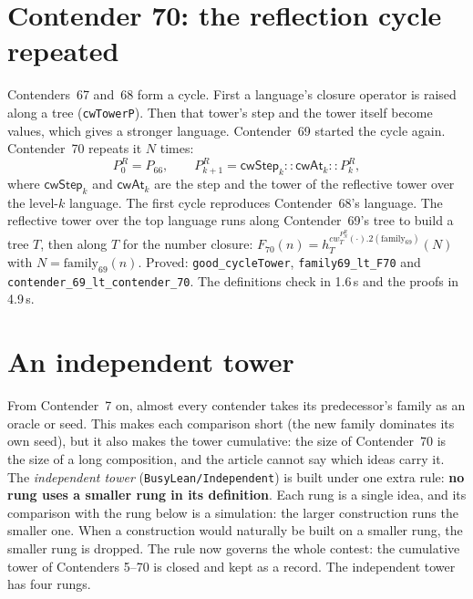 \documentclass[11pt]{article}
\theoremstyle{definition}
\theoremstyle{remark}
\newcommand{\lean}[1]{\texttt{#1}}
\begin{document}
\section{Contender 70: the reflection cycle repeated}

Contenders~67 and~68 form a cycle. First a language's closure operator is
raised along a tree (\lean{cwTowerP}). Then that tower's step and the tower
itself become values, which gives a stronger language. Contender~69 started the
cycle again. Contender~70 repeats it $N$ times:
\[
P^R_0=P_{66},\qquad
P^R_{k+1}=\mathsf{cwStep}_{k}::\mathsf{cwAt}_{k}::P^R_k,
\]
where $\mathsf{cwStep}_k$ and $\mathsf{cwAt}_k$ are the step and the tower of the
reflective tower over the level-$k$ language. The first cycle reproduces
Contender~68's language. The reflective tower over the top language runs along
Contender~69's tree to build a tree $T$, then along $T$ for the number closure:
$F_{70}(n)=h^{cw^{P^R_N}_T(\cdot).2(\mathrm{family}_{69})}_T(N)$ with
$N=\mathrm{family}_{69}(n)$. Proved: \lean{good\_cycleTower},
\lean{family69\_lt\_F70} and \lean{contender\_69\_lt\_\allowbreak contender\_70}.
The definitions check in 1.6\,s and the proofs in 4.9\,s.

\section{An independent tower}\label{sec:independent}

From Contender~7 on, almost every contender takes its predecessor's family as
an oracle or seed. This makes each comparison short (the new family dominates
its own seed), but it also makes the tower cumulative: the size of
Contender~70 is the size of a long composition, and the article cannot say
which ideas carry it. The \emph{independent tower} (\lean{BusyLean/Independent})
is built under one extra rule: \textbf{no rung uses a smaller rung in its
definition}. Each rung is a single idea, and its comparison with the rung
below is a simulation: the larger construction runs the smaller one. When a
construction would naturally be built on a smaller rung, the smaller rung is
dropped. The rule now governs the whole contest: the cumulative tower of
Contenders 5--70 is closed and kept as a record. The independent tower has
four rungs.
\end{document}
